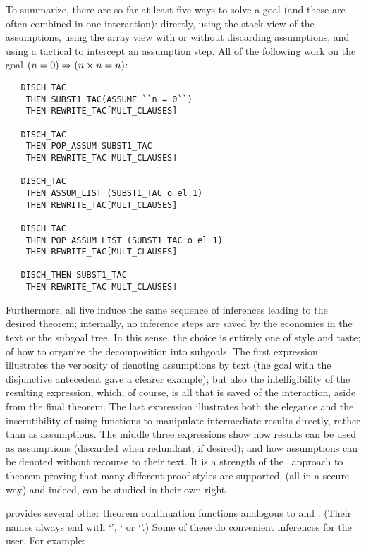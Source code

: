 To summarize, there are so far at least five ways to solve a goal
(and these are often combined in one interaction):
directly, using the stack view of the assumptions,
using the array view with or without discarding assumptions, and using a
tactical to intercept an assumption step.  All of the following work
on the goal $(n=0) \Rightarrow (n \times n = n)$:

\begin{hol}
\begin{verbatim}
   DISCH_TAC
    THEN SUBST1_TAC(ASSUME ``n = 0``)
    THEN REWRITE_TAC[MULT_CLAUSES]

   DISCH_TAC
    THEN POP_ASSUM SUBST1_TAC
    THEN REWRITE_TAC[MULT_CLAUSES]

   DISCH_TAC
    THEN ASSUM_LIST (SUBST1_TAC o el 1)
    THEN REWRITE_TAC[MULT_CLAUSES]

   DISCH_TAC
    THEN POP_ASSUM_LIST (SUBST1_TAC o el 1)
    THEN REWRITE_TAC[MULT_CLAUSES]

   DISCH_THEN SUBST1_TAC
    THEN REWRITE_TAC[MULT_CLAUSES]
\end{verbatim}\end{hol}

\noindent Furthermore, all five induce the
same sequence of inferences leading to
the desired theorem; internally, no inference steps are saved by the
economies in the \ML{} text or the subgoal tree.  In this sense,
the choice is entirely one of style and taste;
of how to organize the decomposition into subgoals.
The first expression illustrates the verbosity of denoting
assumptions by text (the goal with the
disjunctive antecedent gave a clearer
example); but also
the intelligibility of the resulting expression, which, of course, is all
that is saved of the interaction, aside from the final theorem.
The last expression
illustrates both the elegance and the inscrutibility of
using functions to manipulate intermediate results directly, rather than
as assumptions.
The middle three expressions
show how results can be used as assumptions (discarded when
redundant, if desired); and how
assumptions can be denoted without
recourse to their text.
%
It is a strength of the \LCF\ approach  to theorem proving that many different proof styles are supported, (all in a secure way) and indeed, can be studied in their own right.

\HOL{} provides several other theorem continuation functions analogous to
 and .
(Their names always end with
`', ` or `'.)
Some of these do convenient inferences for the user.
For example:


